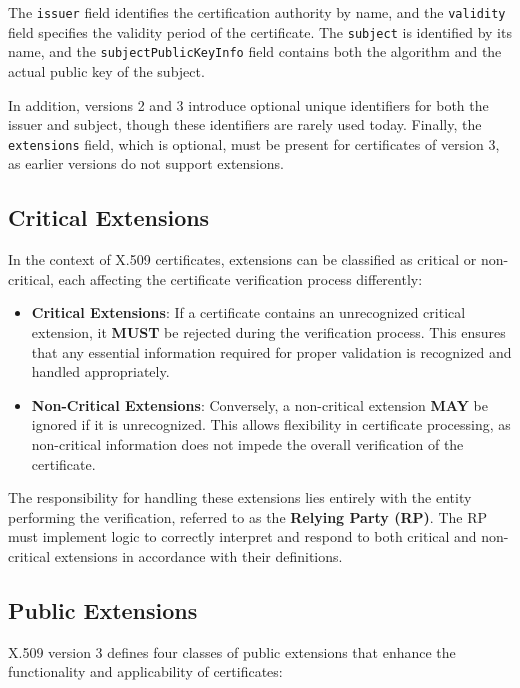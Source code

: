 The \texttt{issuer} field identifies the certification authority by
name, and the \texttt{validity} field specifies the validity period of
the certificate. The \texttt{subject} is identified by its name, and
the \texttt{subjectPublicKeyInfo} field contains both the algorithm
and the actual public key of the subject.

In addition, versions 2 and 3 introduce optional unique identifiers
for both the issuer and subject, though these identifiers are rarely
used today. Finally, the \texttt{extensions} field, which is optional,
must be present for certificates of version 3, as earlier versions do
not support extensions.


\subsection{Critical Extensions}

In the context of X.509 certificates, extensions can be classified as
critical or non-critical, each affecting the certificate verification
process differently:

\begin{itemize}
  \item \textbf{Critical Extensions}: If a certificate contains an
    unrecognized critical extension, it \textbf{MUST} be rejected
    during the verification process. This ensures that any essential
    information required for proper validation is recognized and
    handled appropriately.

  \item \textbf{Non-Critical Extensions}: Conversely, a non-critical
    extension \textbf{MAY} be ignored if it is unrecognized. This
    allows flexibility in certificate processing, as non-critical
    information does not impede the overall verification of the
    certificate.
\end{itemize}

The responsibility for handling these extensions lies entirely with
the entity performing the verification, referred to as the
\textbf{Relying Party (RP)}. The RP must implement logic to correctly
interpret and respond to both critical and non-critical extensions in
accordance with their definitions.

\subsection{Public Extensions}

X.509 version 3 defines four classes of public extensions that enhance
the functionality and applicability of certificates:

